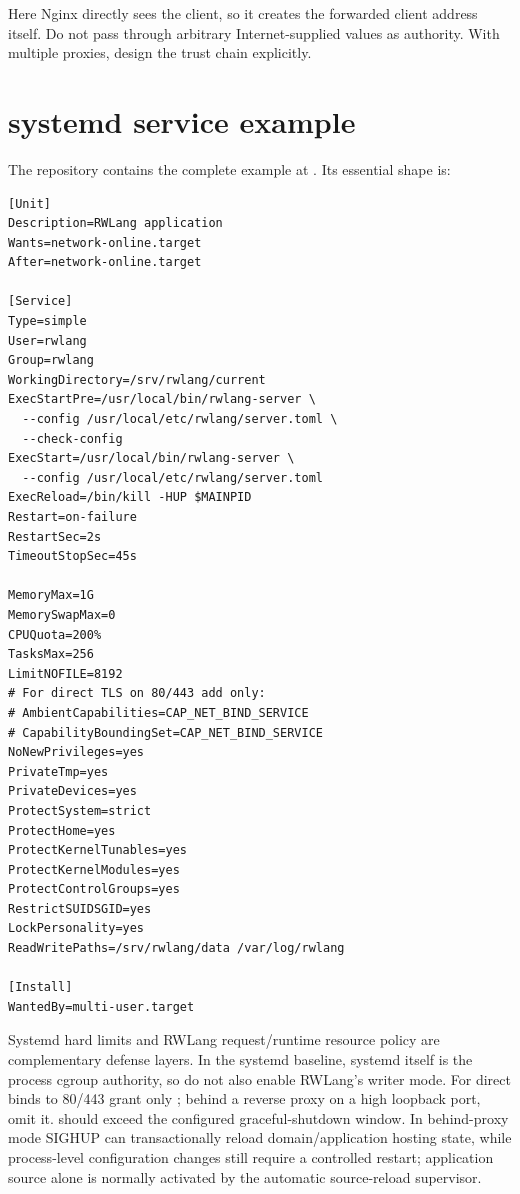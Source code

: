 Here Nginx directly sees the client, so it creates the forwarded client address itself. Do not pass through arbitrary Internet-supplied  values as authority. With multiple proxies, design the trust chain explicitly.

\section{systemd service example}

The repository contains the complete example at . Its essential shape is:

\begin{lstlisting}
[Unit]
Description=RWLang application
Wants=network-online.target
After=network-online.target

[Service]
Type=simple
User=rwlang
Group=rwlang
WorkingDirectory=/srv/rwlang/current
ExecStartPre=/usr/local/bin/rwlang-server \
  --config /usr/local/etc/rwlang/server.toml \
  --check-config
ExecStart=/usr/local/bin/rwlang-server \
  --config /usr/local/etc/rwlang/server.toml
ExecReload=/bin/kill -HUP $MAINPID
Restart=on-failure
RestartSec=2s
TimeoutStopSec=45s

MemoryMax=1G
MemorySwapMax=0
CPUQuota=200%
TasksMax=256
LimitNOFILE=8192
# For direct TLS on 80/443 add only:
# AmbientCapabilities=CAP_NET_BIND_SERVICE
# CapabilityBoundingSet=CAP_NET_BIND_SERVICE
NoNewPrivileges=yes
PrivateTmp=yes
PrivateDevices=yes
ProtectSystem=strict
ProtectHome=yes
ProtectKernelTunables=yes
ProtectKernelModules=yes
ProtectControlGroups=yes
RestrictSUIDSGID=yes
LockPersonality=yes
ReadWritePaths=/srv/rwlang/data /var/log/rwlang

[Install]
WantedBy=multi-user.target
\end{lstlisting}

Systemd hard limits and RWLang request/runtime resource policy are complementary defense layers. In the systemd baseline, systemd itself is the process cgroup authority, so do not also enable RWLang's \code{[cgroup]} writer mode. For direct binds to 80/443 grant only ; behind a reverse proxy on a high loopback port, omit it.  should exceed the configured graceful-shutdown window. In behind-proxy mode SIGHUP can transactionally reload domain/application hosting state, while process-level configuration changes still require a controlled restart; application source alone is normally activated by the automatic source-reload supervisor.

